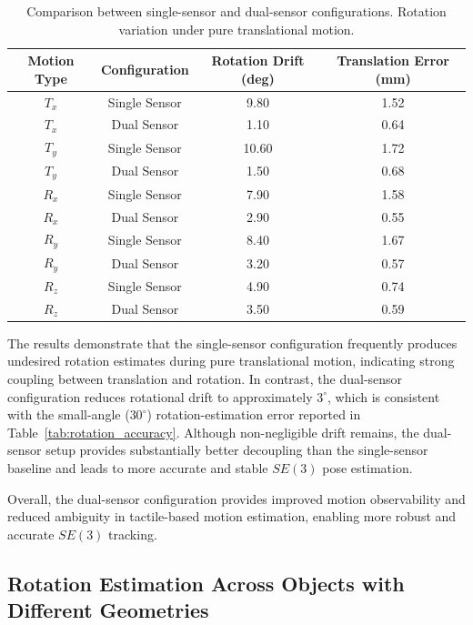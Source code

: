 \documentclass[letterpaper,10pt,journal,twoside]{IEEEtran}
\begin{document}
\begin{table}[ht]
\centering
\caption{Comparison between single-sensor and dual-sensor configurations. Rotation variation under pure translational motion.}
\label{tab:dual_sensor}
\begin{tabular}{cccc}
\toprule
Motion Type & Configuration & Rotation Drift (deg) & Translation Error (mm) \\
\midrule
$T_x$ & Single Sensor & 9.80 & 1.52 \\
$T_x$ & Dual Sensor & 1.10 & 0.64 \\
\midrule
$T_y$ & Single Sensor & 10.60 & 1.72 \\
$T_y$ & Dual Sensor & 1.50 & 0.68 \\
\midrule
$R_x$ & Single Sensor & 7.90 & 1.58 \\
$R_x$ & Dual Sensor & 2.90 & 0.55 \\
\midrule
$R_y$ & Single Sensor & 8.40 & 1.67 \\
$R_y$ & Dual Sensor & 3.20 & 0.57 \\
\midrule
$R_z$ & Single Sensor & 4.90 & 0.74 \\
$R_z$ & Dual Sensor & 3.50 & 0.59 \\
\bottomrule
\end{tabular}
\end{table}

The results demonstrate that the single-sensor configuration frequently produces undesired rotation estimates during pure translational motion, indicating strong coupling between translation and rotation. In contrast, the dual-sensor configuration reduces rotational drift to approximately $3^\circ$, which is consistent with the small-angle ($30^\circ$) rotation-estimation error reported in Table~\ref{tab:rotation_accuracy}. Although non-negligible drift remains, the dual-sensor setup provides substantially better decoupling than the single-sensor baseline and leads to more accurate and stable $SE(3)$ pose estimation.

Overall, the dual-sensor configuration provides improved motion observability and reduced ambiguity in tactile-based motion estimation, enabling more robust and accurate $SE(3)$ tracking.

\subsection{Rotation Estimation Across Objects with Different Geometries}
\label{subsec:DifferentGeo}
\end{document}
